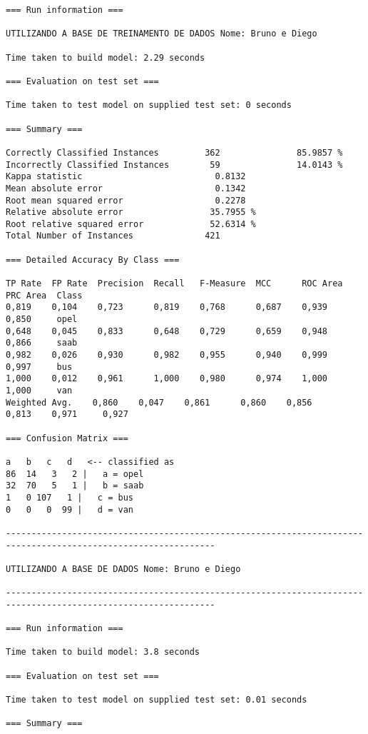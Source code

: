 \documentclass[
	article,			%
	11pt,				%
	oneside,			%
	a4paper,			%
	english,			%
	brazil,				%
	sumario=tradicional
	]{abntex2}
\begin{document}
\begin{lstlisting}
=== Run information ===

UTILIZANDO A BASE DE TREINAMENTO DE DADOS Nome: Bruno e Diego

Time taken to build model: 2.29 seconds

=== Evaluation on test set ===

Time taken to test model on supplied test set: 0 seconds

=== Summary ===

Correctly Classified Instances         362               85.9857 %
Incorrectly Classified Instances        59               14.0143 %
Kappa statistic                          0.8132
Mean absolute error                      0.1342
Root mean squared error                  0.2278
Relative absolute error                 35.7955 %
Root relative squared error             52.6314 %
Total Number of Instances              421     

=== Detailed Accuracy By Class ===

TP Rate  FP Rate  Precision  Recall   F-Measure  MCC      ROC Area  PRC Area  Class
0,819    0,104    0,723      0,819    0,768      0,687    0,939     0,850     opel
0,648    0,045    0,833      0,648    0,729      0,659    0,948     0,866     saab
0,982    0,026    0,930      0,982    0,955      0,940    0,999     0,997     bus
1,000    0,012    0,961      1,000    0,980      0,974    1,000     1,000     van
Weighted Avg.    0,860    0,047    0,861      0,860    0,856      0,813    0,971     0,927     

=== Confusion Matrix ===

a   b   c   d   <-- classified as
86  14   3   2 |   a = opel
32  70   5   1 |   b = saab
1   0 107   1 |   c = bus
0   0   0  99 |   d = van

---------------------------------------------------------------------------------------------------------------

UTILIZANDO A BASE DE DADOS Nome: Bruno e Diego

---------------------------------------------------------------------------------------------------------------

=== Run information ===

Time taken to build model: 3.8 seconds

=== Evaluation on test set ===

Time taken to test model on supplied test set: 0.01 seconds

=== Summary ===


\end{lstlisting}
\end{document}
